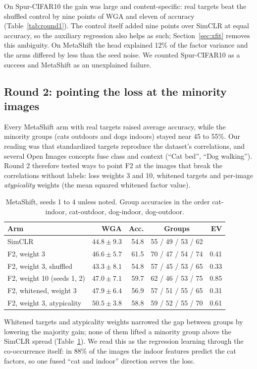 \documentclass{article}
\begin{document}
On Spur-CIFAR10 the gain was large and content-specific: real targets beat the shuffled control by
nine points of WGA and eleven of accuracy (Table~\ref{tab:round1}). The control itself added nine points
over SimCLR at equal accuracy, so the auxiliary regression also helps as such; Section~\ref{sec:xfit}
removes this ambiguity. On MetaShift the head explained 12\% of the factor variance and the arms
differed by less than the seed noise. We counted Spur-CIFAR10 as a success and MetaShift as an
unexplained failure.

\subsection{Round 2: pointing the loss at the minority images}
Every MetaShift arm with real targets raised average accuracy, while the minority groups (cats
outdoors and dogs indoors) stayed near 45 to 55\%. Our reading was that standardized targets reproduce
the dataset's correlations, and several Open Images concepts fuse class and context (``Cat bed'', ``Dog
walking''). Round 2 therefore tested ways to point F2 at the images that break the correlations without
labels: loss weights 3 and 10, whitened targets and per-image \emph{atypicality} weights (the mean
squared whitened factor value).

\begin{table}[h]
\centering
\caption{MetaShift, seeds 1 to 4 unless noted. Group accuracies in the order cat-indoor, cat-outdoor,
dog-indoor, dog-outdoor.}
\label{tab:round2}
\small
\begin{tabular}{l r r c r}
\toprule
Arm & WGA & Acc. & Groups & EV \\
\midrule
SimCLR & $44.8\pm9.3$ & 54.8 & 55 / 49 / 53 / 62 & \\
F2, weight 3 & $46.6\pm5.7$ & 61.5 & 70 / 47 / 54 / 74 & 0.41 \\
F2, weight 3, shuffled & $43.3\pm8.1$ & 54.8 & 57 / 45 / 53 / 65 & 0.33 \\
F2, weight 10 (seeds 1, 2) & $47.0\pm7.1$ & 59.7 & 62 / 46 / 53 / 75 & 0.85 \\
F2, whitened, weight 3 & $47.9\pm6.4$ & 56.9 & 57 / 51 / 55 / 65 & 0.31 \\
F2, weight 3, atypicality & $50.5\pm3.8$ & 58.8 & 59 / 52 / 55 / 70 & 0.61 \\
\bottomrule
\end{tabular}
\end{table}

Whitened targets and atypicality weights narrowed the gap between groups by lowering the majority gain;
none of them lifted a minority group above the SimCLR spread (Table~\ref{tab:round2}). We read this as
the regression learning through the co-occurrence itself: in 88\% of the images the indoor features
predict the cat factors, so one fused ``cat and indoor'' direction serves the loss.
\end{document}
